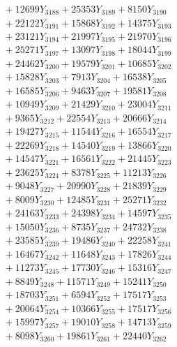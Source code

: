 \documentclass[a4paper,10pt]{article}
\begin{document}
{\begin{align}
&\;  + 12699 Y_{3188} + 25353 Y_{3189} + 8150 Y_{3190} \\[0.3ex]
&\;  + 22122 Y_{3191} + 15868 Y_{3192} + 14375 Y_{3193} \\[0.3ex]
&\;  + 23121 Y_{3194} + 21997 Y_{3195} + 21970 Y_{3196} \\[0.3ex]
&\;  + 25271 Y_{3197} + 13097 Y_{3198} + 18044 Y_{3199} \\[0.3ex]
&\;  + 24462 Y_{3200} + 19579 Y_{3201} + 10685 Y_{3202} \\[0.3ex]
&\;  + 15828 Y_{3203} + 7913 Y_{3204} + 16538 Y_{3205} \\[0.3ex]
&\;  + 16585 Y_{3206} + 9463 Y_{3207} + 19581 Y_{3208} \\[0.5ex]\allowbreak
&\;  + 10949 Y_{3209} + 21429 Y_{3210} + 23004 Y_{3211} \\[0.3ex]
&\;  + 9365 Y_{3212} + 22554 Y_{3213} + 20666 Y_{3214} \\[0.3ex]
&\;  + 19427 Y_{3215} + 11544 Y_{3216} + 16554 Y_{3217} \\[0.3ex]
&\;  + 22269 Y_{3218} + 14540 Y_{3219} + 13866 Y_{3220} \\[0.3ex]
&\;  + 14547 Y_{3221} + 16561 Y_{3222} + 21445 Y_{3223} \\[0.3ex]
&\;  + 23625 Y_{3224} + 8378 Y_{3225} + 11213 Y_{3226} \\[0.3ex]
&\;  + 9048 Y_{3227} + 20990 Y_{3228} + 21839 Y_{3229} \\[0.3ex]
&\;  + 8009 Y_{3230} + 12485 Y_{3231} + 25271 Y_{3232} \\[0.3ex]
&\;  + 24163 Y_{3233} + 24398 Y_{3234} + 14597 Y_{3235} \\[0.3ex]
&\;  + 15050 Y_{3236} + 8735 Y_{3237} + 24732 Y_{3238} \\[0.5ex]\allowbreak
&\;  + 23585 Y_{3239} + 19486 Y_{3240} + 22258 Y_{3241} \\[0.3ex]
&\;  + 16467 Y_{3242} + 11648 Y_{3243} + 17826 Y_{3244} \\[0.3ex]
&\;  + 11273 Y_{3245} + 17730 Y_{3246} + 15316 Y_{3247} \\[0.3ex]
&\;  + 8849 Y_{3248} + 11571 Y_{3249} + 15241 Y_{3250} \\[0.3ex]
&\;  + 18703 Y_{3251} + 6594 Y_{3252} + 17517 Y_{3253} \\[0.3ex]
&\;  + 20064 Y_{3254} + 10366 Y_{3255} + 17517 Y_{3256} \\[0.3ex]
&\;  + 15997 Y_{3257} + 19010 Y_{3258} + 14713 Y_{3259} \\[0.3ex]
&\;  + 8098 Y_{3260} + 19861 Y_{3261} + 22440 Y_{3262} \\[0.3ex]

\end{align}}
\end{document}
